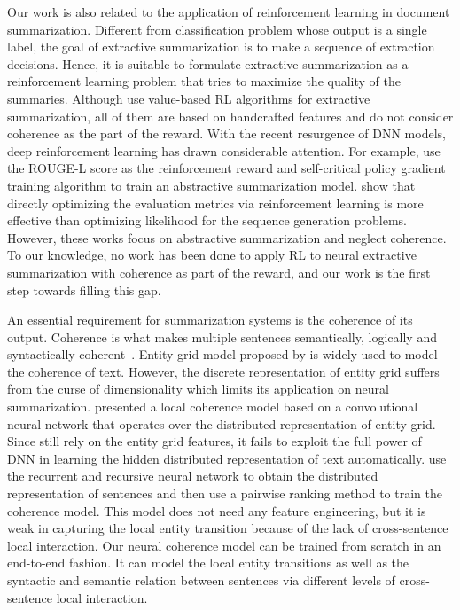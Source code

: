\documentclass[letterpaper]{article} \usepackage{aaai18}  \usepackage{times}  \usepackage{helvet}  \usepackage{courier}  \usepackage{url}  \usepackage{graphicx}  \usepackage{amssymb}
\begin{document}
	Our work is also related to the application of reinforcement learning in document summarization. Different from classification problem whose output is a single label, the goal of extractive summarization is to make a sequence of extraction decisions. Hence, it is suitable to formulate extractive summarization as a reinforcement learning problem that tries to maximize the quality of the summaries. Although \cite{ryang_framework_2012,rioux_fear_2014,hens_s_reinforcement_2015} use value-based RL algorithms for extractive summarization, all of them are based on handcrafted features and do not consider coherence as the part of the reward. With the recent resurgence of DNN models, deep reinforcement learning has drawn considerable attention. For example, \cite{socher2017_summarization} use the ROUGE-L score as the reinforcement reward and self-critical policy gradient training algorithm to train an abstractive summarization model. \cite{ayana2016,sltrnn2016} show that directly optimizing the evaluation metrics via reinforcement learning is more effective than optimizing likelihood for the sequence generation problems. However, these works focus on abstractive summarization and neglect coherence. To our knowledge, no work has been done to apply RL to neural extractive summarization with coherence as part of the reward, and our work is the first step towards filling this gap.
	
	An essential requirement for summarization systems is the coherence of its output. Coherence is what makes multiple sentences semantically, logically and syntactically coherent~\cite{Yao2017RecentAI}.  Entity grid model proposed by \cite{entitygrid} is widely used to model the coherence of text. However, the discrete representation of entity grid suffers from the curse of dimensionality which limits its application on neural summarization. \cite{nlcm} presented a local coherence model based on a convolutional neural network that operates over the distributed representation of entity grid. Since \cite{nlcm} still rely on the entity grid features, it fails to exploit the full power of DNN in learning the hidden distributed representation of text automatically. \cite{jiweili2014} use the recurrent and recursive neural network to obtain the distributed representation of sentences and then use a pairwise ranking method to train the coherence model. This model does not need any feature engineering, but it is weak in capturing the local entity transition because of the lack of cross-sentence local interaction. Our neural coherence model can be trained from scratch in an end-to-end fashion. It can model the local entity transitions as well as the syntactic and semantic relation between sentences via different levels of cross-sentence local interaction.
\end{document}
